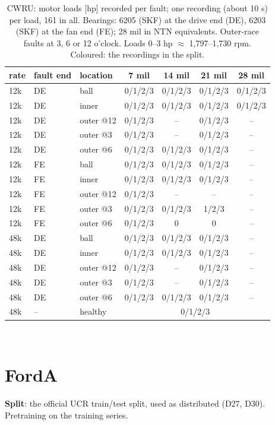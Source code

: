\begin{table}[ht]
\centering
\footnotesize
\begin{tabular}{lllcccc}
\toprule
rate & fault end & location & 7 mil & 14 mil & 21 mil & 28 mil \\
\midrule
12k & DE & ball & \colorbox{bothc}{0}/1/2/3 & \colorbox{bothc}{0}/1/2/3 & \colorbox{bothc}{0}/1/2/3 & 0/1/2/3 \\
12k & DE & inner & \colorbox{bothc}{0}/1/2/3 & \colorbox{bothc}{0}/1/2/3 & \colorbox{bothc}{0}/1/2/3 & 0/1/2/3 \\
12k & DE & outer @12 & 0/1/2/3 & -- & 0/1/2/3 & -- \\
12k & DE & outer @3 & 0/1/2/3 & -- & 0/1/2/3 & -- \\
12k & DE & outer @6 & \colorbox{bothc}{0}/1/2/3 & \colorbox{bothc}{0}/1/2/3 & \colorbox{bothc}{0}/1/2/3 & -- \\
\midrule
12k & FE & ball & 0/1/2/3 & 0/1/2/3 & 0/1/2/3 & -- \\
12k & FE & inner & 0/1/2/3 & 0/1/2/3 & 0/1/2/3 & -- \\
12k & FE & outer @12 & 0/1/2/3 & -- & -- & -- \\
12k & FE & outer @3 & 0/1/2/3 & 0/1/2/3 & 1/2/3 & -- \\
12k & FE & outer @6 & 0/1/2/3 & 0 & 0 & -- \\
\midrule
48k & DE & ball & 0/1/2/3 & 0/1/2/3 & 0/1/2/3 & -- \\
48k & DE & inner & 0/1/2/3 & 0/1/2/3 & 0/1/2/3 & -- \\
48k & DE & outer @12 & 0/1/2/3 & -- & 0/1/2/3 & -- \\
48k & DE & outer @3 & 0/1/2/3 & -- & 0/1/2/3 & -- \\
48k & DE & outer @6 & 0/1/2/3 & 0/1/2/3 & 0/1/2/3 & -- \\
\midrule
48k & -- & healthy & \multicolumn{4}{c}{\colorbox{bothc}{0}/1/2/3} \\
\bottomrule
\end{tabular}
\\[4pt] \splitlegend
\caption{CWRU: motor loads [hp] recorded per fault; one recording (about 10 s) per load, 161 in all. Bearings: 6205 (SKF) at the drive end (DE), 6203 (SKF) at the fan end (FE); 28 mil in NTN equivalents. Outer-race faults at 3, 6 or 12 o'clock. Loads 0--3 hp $\approx$ 1,797--1,730 rpm. Coloured: the recordings in the split.}
\end{table}

\section{FordA}
\textbf{Split}: the official UCR train/test split, used as distributed (D27, D30). Pretraining on the training series.

